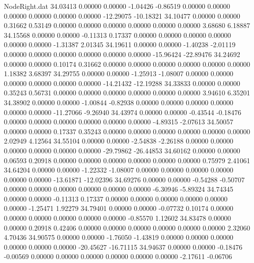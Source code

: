 \begin{filecontents}{NodeRight.dat}
  34.03413    0.00000    0.00000    -1.04426   -0.86519    0.00000    0.00000    0.00000    0.00000    0.00000    0.00000  -12.29075  -10.18321
  34.10477    0.00000    0.00000     0.31662    0.53149    0.00000    0.00000    0.00000    0.00000    0.00000    0.00000    3.68680    6.18887
  34.15568    0.00000    0.00000    -0.11313    0.17337    0.00000    0.00000    0.00000    0.00000    0.00000    0.00000   -1.31387    2.01345
  34.19611    0.00000    0.00000    -1.40238   -2.01119    0.00000    0.00000    0.00000    0.00000    0.00000    0.00000  -15.96424  -22.89476
  34.24692    0.00000    0.00000     0.10174    0.31662    0.00000    0.00000    0.00000    0.00000    0.00000    0.00000    1.18382    3.68397
  34.29755    0.00000    0.00000    -1.25913   -1.08007    0.00000    0.00000    0.00000    0.00000    0.00000    0.00000  -14.21432  -12.19288
  34.33833    0.00000    0.00000     0.35243    0.56731    0.00000    0.00000    0.00000    0.00000    0.00000    0.00000    3.94610    6.35201
  34.38902    0.00000    0.00000    -1.00844   -0.82938    0.00000    0.00000    0.00000    0.00000    0.00000    0.00000  -11.27066   -9.26940
  34.43974    0.00000    0.00000    -0.43544   -0.18476    0.00000    0.00000    0.00000    0.00000    0.00000    0.00000   -4.89315   -2.07613
  34.50057    0.00000    0.00000     0.17337    0.35243    0.00000    0.00000    0.00000    0.00000    0.00000    0.00000    2.02949    4.12564
  34.55104    0.00000    0.00000    -2.54838   -2.26188    0.00000    0.00000    0.00000    0.00000    0.00000    0.00000  -29.79862  -26.44853
  34.60162    0.00000    0.00000     0.06593    0.20918    0.00000    0.00000    0.00000    0.00000    0.00000    0.00000    0.75979    2.41061
  34.64204    0.00000    0.00000    -1.22332   -1.08007    0.00000    0.00000    0.00000    0.00000    0.00000    0.00000  -13.61871  -12.02396
  34.69276    0.00000    0.00000    -0.54288   -0.50707    0.00000    0.00000    0.00000    0.00000    0.00000    0.00000   -6.30946   -5.89324
  34.74345    0.00000    0.00000    -0.11313    0.17337    0.00000    0.00000    0.00000    0.00000    0.00000    0.00000   -1.25471    1.92279
  34.79401    0.00000    0.00000    -0.07732    0.10174    0.00000    0.00000    0.00000    0.00000    0.00000    0.00000   -0.85570    1.12602
  34.83478    0.00000    0.00000     0.20918    0.42406    0.00000    0.00000    0.00000    0.00000    0.00000    0.00000    2.32060    4.70436
  34.90575    0.00000    0.00000    -1.76050   -1.43819    0.00000    0.00000    0.00000    0.00000    0.00000    0.00000  -20.45627  -16.71115
  34.94637    0.00000    0.00000    -0.18476   -0.00569    0.00000    0.00000    0.00000    0.00000    0.00000    0.00000   -2.17611   -0.06706

\end{filecontents}

